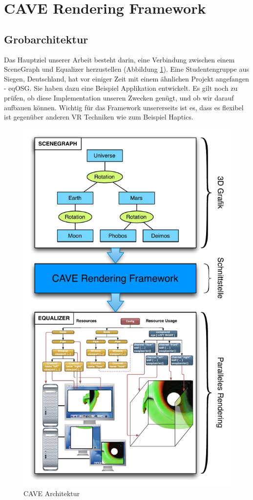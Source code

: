 \section{CAVE Rendering Framework}

\subsection{Grobarchitektur}
Das Hauptziel unserer Arbeit besteht darin, eine Verbindung zwischen einem SceneGraph und Equalizer herzustellen (Abbildung \ref{cave_arch}). Eine Studentengruppe aus Siegen, Deutschland, hat vor einiger Zeit mit einem \"ahnlichen Projekt angefangen - eqOSG. Sie haben dazu eine Beispiel Applikation entwickelt. Es gilt noch zu pr\"ufen, ob diese Implementation unseren Zwecken gen\"ugt, und ob wir darauf aufbauen k\"onnen.
Wichtig f\"ur das Framework unsererseits ist es, dass es flexibel ist gegen\"uber anderen VR Techniken wie zum Beispiel Haptics.

\begin{figure}[ht]
\centering
\includegraphics[scale=0.6]{../figures/crf_architecture_pflichtenheft}
\caption{CAVE Architektur}
\label{cave_arch}
\end{figure}

